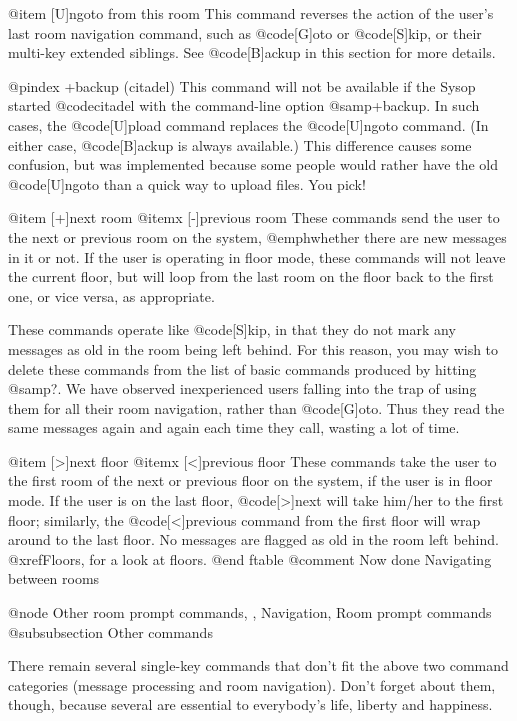 @item [U]ngoto from this room
This command reverses the action of the user's last room
navigation command, such as @code{[G]oto} or @code{[S]kip}, or their multi-key
extended siblings.  See @code{[B]ackup} in this section for more details.

@pindex +backup (citadel)
This command will not be available if the Sysop started @code{citadel}
with the command-line option @samp{+backup}.  In such cases, the @code{[U]pload}
command replaces the @code{[U]ngoto} command.  (In either case,
@code{[B]ackup} is always available.)  This difference causes some
confusion, but was implemented because some people would rather have
the old @code{[U]ngoto} than a quick way to upload files.  You pick!

@item [+]next room
@itemx [-]previous room
These commands send the user to the next or previous room on the
system, @emph{whether there are new messages in it or not}.  If the user is
operating in floor mode, these commands will not leave the current
floor, but will loop from the last room on the floor back to the
first one, or vice versa, as appropriate.

These commands operate like @code{[S]kip}, in that they do not mark any
messages as old in the room being left behind.  For this reason, you
may wish to delete these commands from the
list of basic commands produced by hitting @samp{?}.  We have observed
inexperienced users falling into the trap of using them for
all their room navigation, rather than @code{[G]oto}.  Thus they read the
same messages again and again each time they call, wasting a lot of time.

@item [>]next floor
@itemx [<]previous floor
These commands take the user to the first room of the next or previous
floor on the system, if the user is in floor mode.  If the user is
on the last floor, @code{[>]next} will take him/her to the first floor;
similarly, the @code{[<]previous} command from the first floor will wrap
around to the last floor.
No messages are flagged as old in the room left behind.  @xref{Floors},
for a look at floors.
@end ftable
@comment Now done Navigating between rooms

@node Other room prompt commands,  , Navigation, Room prompt commands
@subsubsection Other commands

There remain several single-key commands that don't fit the above
two command categories (message processing and room navigation).  Don't
forget about them, though, because several are essential to everybody's
life, liberty and happiness.


